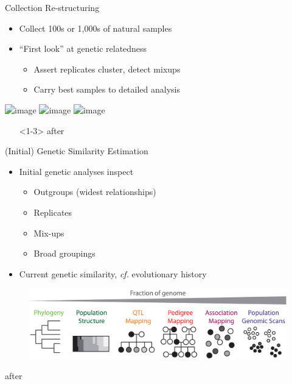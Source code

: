 \documentclass[t]{beamer}
\begin{document}
\begin{frame}{Collection Re-structuring}
  \begin{itemize}
    \item Collect 100s or 1,000s of natural samples
    \item ``First look'' at genetic relatedness
    \begin{itemize}
      \item Assert replicates cluster, detect mixups
      \item Carry best samples to detailed analysis
    \end{itemize}
  \end{itemize}
  \begin{center}
    \includegraphics<1>[width=\textwidth]{img/restruct-1}
    \includegraphics<2>[width=\textwidth]{img/restruct-2}
    \includegraphics<3>[width=\textwidth]{img/restruct-3}
    \begin{itemize}
      \item[]<1-3> \tiny{after \textcite{brachi_genome-wide_2011}}
    \end{itemize}
  \end{center}
\end{frame}


\begin{frame}{(Initial) Genetic Similarity Estimation}
  \begin{itemize}
    \item Initial genetic analyses inspect
      \begin{itemize}
        \item Outgroups (widest relationships)
        \item Replicates
        \item Mix-ups
        \item Broad groupings
      \end{itemize}
  \item Current genetic similarity, \textit{cf.} evolutionary history
  \end{itemize}
  \begin{figure}
    \centering
    \includegraphics[width=\textwidth]{img/cross-scale.png}
  \end{figure}
  \tiny{after \textcite{peterson_double_2012}}
\end{frame}
\end{document}
